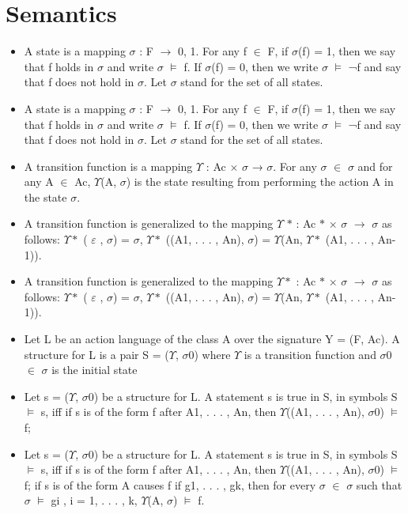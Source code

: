 \documentclass[11pt]{article}
\begin{document}
	\section{Semantics}
	\begin{itemize}
\item 	A state is a mapping $\sigma$ : F $\rightarrow$ {0, 1}. For any f $\in$ F, if $\sigma$(f) = 1, then we say that f holds in $\sigma$ and write $\sigma$   $\vDash$   f. If $\sigma$(f) = 0, then we write $\sigma$   $\vDash$   ¬f and say that f does not hold in $\sigma$. Let $\sigma$ stand for the set of all states.
\item 	A state is a mapping $\sigma$ : F $\rightarrow$ {0, 1}. For any f $\in$ F, if $\sigma$(f) = 1, then we say that f holds in $\sigma$ and write $\sigma$   $\vDash$   f. If $\sigma$(f) = 0, then we write $\sigma$   $\vDash$   ¬f and say that f does not hold in $\sigma$. Let $\sigma$ stand for the set of all states.
\item 	A transition function is a mapping $\Upsilon$ : Ac $\times$ $\sigma$ → $\sigma$. For any $\sigma$ $\in$ $\sigma$ and for any A $\in$ Ac, $\Upsilon$(A, $\sigma$) is the state resulting from performing the action A in the state $\sigma$.
\item 	A transition function is generalized to the mapping $\Upsilon$ $\ast$ : Ac $\ast$  $\times$  $\sigma$ $\rightarrow$ $\sigma$ as follows: 
$\Upsilon\ast$ ( $\varepsilon$ , $\sigma$) = $\sigma$, $\Upsilon\ast$ ((A1, . . . , An), $\sigma$) = $\Upsilon$(An, $\Upsilon\ast$ (A1, . . . , An-1)).
\item 	A transition function is generalized to the mapping $\Upsilon\ast$ : Ac $\ast$  $\times$  $\sigma$ $\rightarrow$ $\sigma$ as follows: $\Upsilon\ast$ ( $\varepsilon$ , $\sigma$) = $\sigma$, $\Upsilon\ast$ ((A1, . . . , An), $\sigma$) = $\Upsilon$(An, $\Upsilon\ast$ (A1, . . . , An-1)).
\item 	Let L be an action language of the class A over the signature Y = (F, Ac). A structure for L is a pair S = ($\Upsilon$, $\sigma$0) where $\Upsilon$ is a transition function and $\sigma$0 $\in$ $\sigma$ is the initial state
\item 	Let s = ($\Upsilon$, $\sigma$0) be a structure for L. A statement s is true in S, in symbols S   $\vDash$   s, iff if s is of the form f after A1, . . . , An, then $\Upsilon$((A1, . . . , An), $\sigma$0)   $\vDash$   f;
\item 	Let s = ($\Upsilon$, $\sigma$0) be a structure for L. A statement s is true in S, in symbols S   $\vDash$   s, iff if s is of the form f after A1, . . . , An, then $\Upsilon$((A1, . . . , An), $\sigma$0)   $\vDash$   f; if s is of the form A causes f if g1, . . . , gk, then for every $\sigma$ $\in$ $\sigma$ such that $\sigma$   $\vDash$   gi , i = 1, . . . , k, $\Upsilon$(A, $\sigma$)   $\vDash$   f.
\end{itemize}
\end{document}
